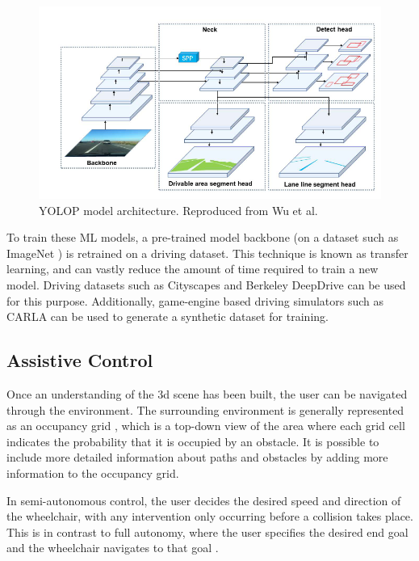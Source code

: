 \documentclass[12pt]{article}
\begin{document}
\begin{figure}[H]
    \centering
    \includegraphics[width=0.7\linewidth]{images/yolop.png}
    \caption{YOLOP model architecture. Reproduced from Wu et al. \cite{wuYOLOPYouOnly2021}}
    \label{fig:yolop}
\end{figure}

To train these ML models, a pre-trained model backbone (on a dataset such as ImageNet \cite{jiadengImageNetLargescaleHierarchical2009})
is retrained on a driving dataset. This technique is known as transfer learning, and can vastly reduce the amount of time required
to train a new model.
Driving datasets such as Cityscapes \cite{cordtsCityscapesDatasetSemantic2016} and Berkeley DeepDrive \cite{yuBDD100KDiverseDriving2018}
can be used for this purpose. Additionally, game-engine based driving simulators such as CARLA \cite{dosovitskiyCARLAOpenUrban2017} can be used to generate a
synthetic dataset for training.



\pagebreak
\subsection{Assistive Control}
Once an understanding of the 3d scene has been built, the user can be navigated through the environment.
The surrounding environment is generally represented as an occupancy grid \cite{elfesUsingOccupancyGrids1989},
which is a top-down view of the area where each grid cell indicates the probability that it is occupied
by an obstacle. It is possible to include more detailed information about
paths and obstacles by adding more information to the occupancy grid.

In semi-autonomous control, the user decides the desired speed and direction of the wheelchair, with any intervention only
occurring before a collision takes place. This is in contrast to full autonomy, where the user specifies the
desired end goal and the wheelchair navigates to that goal \cite{wangS2P2SelfSupervisedGoalDirected2021}.
\end{document}
